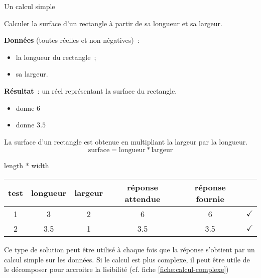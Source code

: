 \begin{Fiche}{Un calcul simple}
\label{fiche:calcul-simple}

Calculer la surface d’un rectangle à partir de sa longueur et sa largeur.
	

	\textbf{Données} (toutes réelles et non négatives)~:
		\begin{itemize}
			\item la longueur du rectangle~;
			\item sa largeur.
		\end{itemize}
		
	\textbf{Résultat}~: un réel représentant la surface du rectangle.

	\begin{center}	
	\end{center}


	\begin{itemize}
	\item {} donne $6$
	\item {} donne $3.5$
	\end{itemize}


	La surface d’un rectangle est obtenue en multipliant
	la largeur par la longueur.
	\[
		\textrm{surface} = \textrm{longueur} * \textrm{largeur}
	\]

	\begin{pseudocode}
			\Return length * width
		\EndAlgo
	\end{pseudocode}


	\begin{center}
		\begin{tabular}{|c|cccc|c|}
		\hline
		\rowcolor{black!40}
		test \no & longueur & largeur & réponse attendue & réponse fournie & {} \\
		\hline 
		1 & 3   & 2 & 6   & 6   & {\color{ForestGreen}$\checkmark$} \\\hline
		2 & 3.5 & 1 & 3.5 & 3.5 & {\color{ForestGreen}$\checkmark$} \\\hline
		\end{tabular}
	\end{center}				


	Ce type de solution peut être utilisé à chaque fois
	que la réponse s’obtient par un calcul simple sur les données.
	Si le calcul est plus complexe, 
	il peut être utile de le décomposer pour accroitre la lisibilité
	(cf. fiche \vref{fiche:calcul-complexe}) 
	
\end{Fiche}
